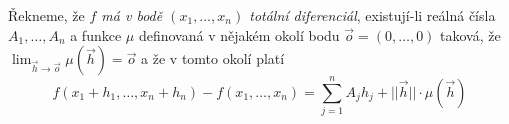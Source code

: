 \begin{definice}
Řekneme, že \emph{$f$ má v bodě $(x_1, \ldots, x_n)$ totální diferenciál}, existují-li reálná čísla $A_1, \ldots, A_n$ a funkce $\mu$ definovaná v nějakém okolí bodu $\vec o = (0, \ldots, 0)$ taková, že $\lim_{\vec h \to \vec o} \mu (\vec h) = \vec o$ a že v tomto okolí platí
$$f(x_1 + h_1, \ldots, x_n + h_n) - f(x_1, \ldots, x_n) = \sum_{j=1}^n A_j h_j + || \vec h || \cdot \mu(\vec h)$$
\end{definice}

